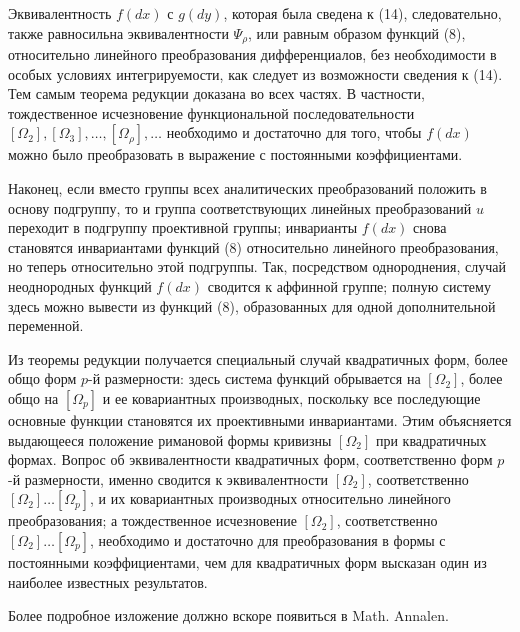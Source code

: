 \documentclass[11pt]{article}
\begin{document}
Эквивалентность \(f(dx)\) с \(g(dy)\), которая была сведена к (14), следовательно, также равносильна эквивалентности \(\Psi_\rho\), или равным образом функций (8), относительно линейного преобразования дифференциалов, без необходимости в особых условиях интегрируемости, как следует из возможности сведения к (14). Тем самым теорема редукции доказана во всех частях. В частности, тождественное исчезновение функциональной последовательности \([\Omega_2],[\Omega_3],\ldots,[\Omega_\rho],\ldots\) необходимо и достаточно для того, чтобы \(f(dx)\) можно было преобразовать в выражение с постоянными коэффициентами.

Наконец, если вместо группы всех аналитических преобразований положить в основу подгруппу, то и группа соответствующих линейных преобразований \(u\) переходит в подгруппу проективной группы; инварианты \(f(dx)\) снова становятся инвариантами функций (8) относительно линейного преобразования, но теперь относительно этой подгруппы. Так, посредством однороднения, случай неоднородных функций \(f(dx)\) сводится к аффинной группе; полную систему здесь можно вывести из функций (8), образованных для одной дополнительной переменной.

Из теоремы редукции получается специальный случай квадратичных форм, более общо форм \(p\)-й размерности: здесь система функций обрывается на \([\Omega_2]\), более общо на \([\Omega_p]\) и ее ковариантных производных, поскольку все последующие основные функции становятся их проективными инвариантами. Этим объясняется выдающееся положение римановой формы кривизны \([\Omega_2]\) при квадратичных формах. Вопрос об эквивалентности квадратичных форм, соответственно форм \(p\)-й размерности, именно сводится к эквивалентности \([\Omega_2]\), соответственно \([\Omega_2]\ldots[\Omega_p]\), и их ковариантных производных относительно линейного преобразования; а тождественное исчезновение \([\Omega_2]\), соответственно \([\Omega_2]\ldots[\Omega_p]\), необходимо и достаточно для преобразования в формы с постоянными коэффициентами, чем для квадратичных форм высказан один из наиболее известных результатов.

Более подробное изложение должно вскоре появиться в Math. Annalen.

\clearpage
\end{document}
